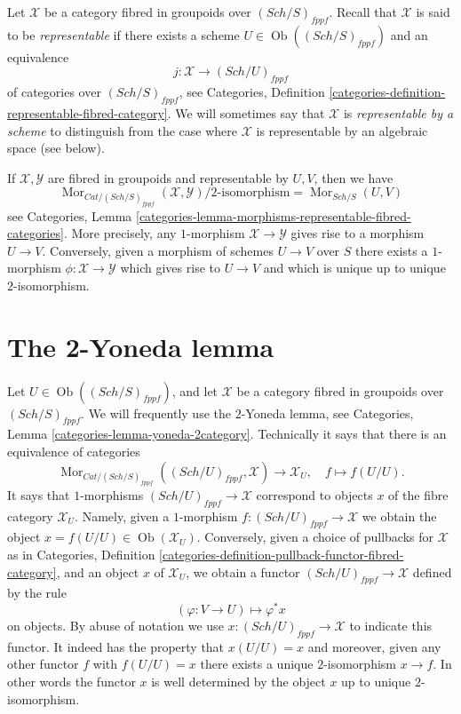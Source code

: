 \documentclass{stacks-project}
\theoremstyle{plain}
\theoremstyle{definition}
\theoremstyle{remark}
\numberwithin{equation}{subsection}
\def\Sch{\mathit{Sch}}
\def\Mor{\mathop{\mathrm{Mor}}\nolimits}
\def\Ob{\mathop{\mathrm{Ob}}\nolimits}
\begin{document}
\medskip\noindent
Let $\mathcal{X}$ be a category fibred in groupoids over
$(\Sch/S)_{fppf}$. Recall that $\mathcal{X}$
is said to be {\it representable} if there exists a
scheme $U \in \Ob((\Sch/S)_{fppf})$ and an
equivalence
$$
j : \mathcal{X} \longrightarrow (\Sch/U)_{fppf}
$$
of categories over $(\Sch/S)_{fppf}$, see
Categories,
Definition \ref{categories-definition-representable-fibred-category}.
We will sometimes say that $\mathcal{X}$ is
{\it representable by a scheme} to distinguish from the case
where $\mathcal{X}$ is representable by an algebraic space (see
below).

\medskip\noindent
If $\mathcal{X}, \mathcal{Y}$ are fibred in groupoids and
representable by $U, V$, then we have
\begin{equation}
\label{equation-morphisms-schemes}
\Mor_{\textit{Cat}/(\Sch/S)_{fppf}}(\mathcal{X}, \mathcal{Y})
\Big/
2\text{-isomorphism}
=
\Mor_{\Sch/S}(U, V)
\end{equation}
see
Categories,
Lemma \ref{categories-lemma-morphisms-representable-fibred-categories}.
More precisely, any $1$-morphism $\mathcal{X} \to \mathcal{Y}$
gives rise to a morphism $U \to V$. Conversely, given a morphism
of schemes $U \to V$ over $S$ there exists a $1$-morphism
$\phi : \mathcal{X} \to \mathcal{Y}$ which gives rise to $U \to V$
and which is unique up to unique $2$-isomorphism.






\section{The 2-Yoneda lemma}
\label{section-2-yoneda}

\noindent
Let $U \in \Ob((\Sch/S)_{fppf})$, and let $\mathcal{X}$ be a
category fibred in groupoids over $(\Sch/S)_{fppf}$.
We will frequently use the $2$-Yoneda lemma, see
Categories, Lemma \ref{categories-lemma-yoneda-2category}.
Technically it says that there is an equivalence of categories
$$
\Mor_{\textit{Cat}/(\Sch/S)_{fppf}}(
(\Sch/U)_{fppf}, \mathcal{X})
\longrightarrow
\mathcal{X}_U, \quad
f \longmapsto f(U/U).
$$
It says that $1$-morphisms $(\Sch/U)_{fppf} \to \mathcal{X}$
correspond to objects $x$ of the fibre category $\mathcal{X}_U$.
Namely, given a $1$-morphism $f : (\Sch/U)_{fppf} \to \mathcal{X}$
we obtain the object $x = f(U/U) \in \Ob(\mathcal{X}_U)$.
Conversely, given a choice of pullbacks for $\mathcal{X}$ as in
Categories,
Definition \ref{categories-definition-pullback-functor-fibred-category},
and an object $x$ of $\mathcal{X}_U$, we obtain a functor
$(\Sch/U)_{fppf} \to \mathcal{X}$ defined by the rule
$$
(\varphi : V \to U) \longmapsto \varphi^*x
$$
on objects. By abuse of notation we use
$x : (\Sch/U)_{fppf} \to \mathcal{X}$
to indicate this functor. It indeed has the property that $x(U/U) = x$
and moreover, given any other functor $f$ with $f(U/U) = x$ there exists
a unique $2$-isomorphism $x \to f$. In other words the functor $x$
is well determined by the object $x$ up to unique $2$-isomorphism.
\end{document}
